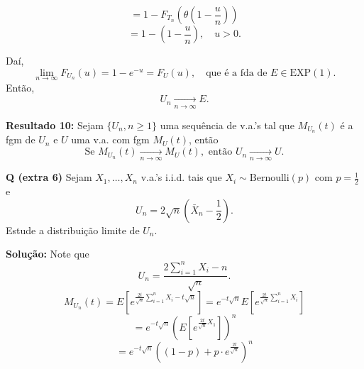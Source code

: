 \[
= 1 - F_{T_n}(\theta (1 - \frac{u}{n}))
\]
\[
= 1 - \left(1 - \frac{u}{n}\right), \quad u > 0.
\]

Daí,
\[
\lim_{n \to \infty} F_{U_n}(u) = 1 - e^{-u} = F_U(u), \quad \text{que é a fda de } E \in \text{EXP}(1).
\]
Então,
\[
U_n \xrightarrow[n \to \infty]{} E.
\]

\textbf{Resultado 10:} Sejam $\{U_n, n \geq 1\}$ uma sequência de v.a.'s tal que $M_{U_n}(t)$ é a fgm de $U_n$ e $U$ uma v.a. com fgm $M_U(t)$, então
\[
\text{Se } M_{U_n}(t) \xrightarrow[n \to \infty]{} M_U(t), \text{ então } U_n \xrightarrow[n \to \infty]{} U.
\]

\textbf{Q (extra 6)} Sejam $X_1, \ldots, X_n$ v.a.'s i.i.d. tais que $X_i \sim \text{Bernoulli}(p)$ com $p = \frac{1}{2}$ e 
\[
U_n = 2 \sqrt{n} \left( \bar{X}_n - \frac{1}{2} \right).
\]
Estude a distribuição limite de $U_n$.

\textbf{Solução:} Note que 
\[
U_n = \frac{2 \sum_{i=1}^n X_i - n}{\sqrt{n}}.
\]
\[
M_{U_n}(t) = E\left[ e^{\frac{2t}{\sqrt{n}} \sum_{i=1}^n X_i - t \sqrt{n}} \right] 
= e^{-t \sqrt{n}} E\left[ e^{\frac{2t}{\sqrt{n}} \sum_{i=1}^n X_i} \right]
\]
\[
= e^{-t \sqrt{n}} \left( E\left[ e^{\frac{2t}{\sqrt{n}} X_1} \right] \right)^n
\]
\[
= e^{-t \sqrt{n}} \left( (1-p) + p \cdot e^{\frac{2t}{\sqrt{n}}} \right)^n
\]